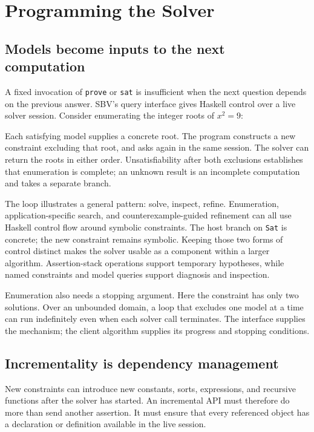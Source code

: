 \documentclass[acmsmall,screen,nonacm]{acmart}
\newcommand{\code}[1]{\texttt{#1}}
\newcommand{\paperlisting}[1]{\par\noindent
  \begin{minipage}{\linewidth}
  
  \end{minipage}\par}
\begin{document}
\section{Programming the Solver}
\label{sec:queries}

\subsection{Models become inputs to the next computation}

A fixed invocation of \code{prove} or \code{sat} is insufficient when the next
question depends on the previous answer. SBV's query interface gives Haskell
control over a live solver session. Consider enumerating the integer roots of
$x^2=9$:
\paperlisting{roots}
Each satisfying model supplies a concrete root. The program constructs a new
constraint excluding that root, and asks again in the same session. The solver
can return the roots in either order. Unsatisfiability after both exclusions
establishes that enumeration is complete; an unknown result is an incomplete
computation and takes a separate branch.

The loop illustrates a general pattern: solve, inspect, refine. Enumeration,
application-specific search, and counterexample-guided refinement can all use
Haskell control flow around symbolic constraints. The host branch on
\code{Sat} is concrete; the new constraint remains symbolic. Keeping those two
forms of control distinct makes the solver usable as a component within a
larger algorithm. Assertion-stack operations support temporary hypotheses,
while named constraints and model queries support diagnosis and inspection.

Enumeration also needs a stopping argument. Here the constraint has only two
solutions. Over an unbounded domain, a loop that excludes
one model at a time can run indefinitely even when each solver call terminates.
The interface supplies the mechanism; the client algorithm supplies its
progress and stopping conditions.

\subsection{Incrementality is dependency management}

New constraints can introduce new constants, sorts, expressions, and recursive
functions after the solver has started. An incremental API must therefore do
more than send another assertion. It must ensure that every referenced object
has a declaration or definition available in the live session.
\end{document}
